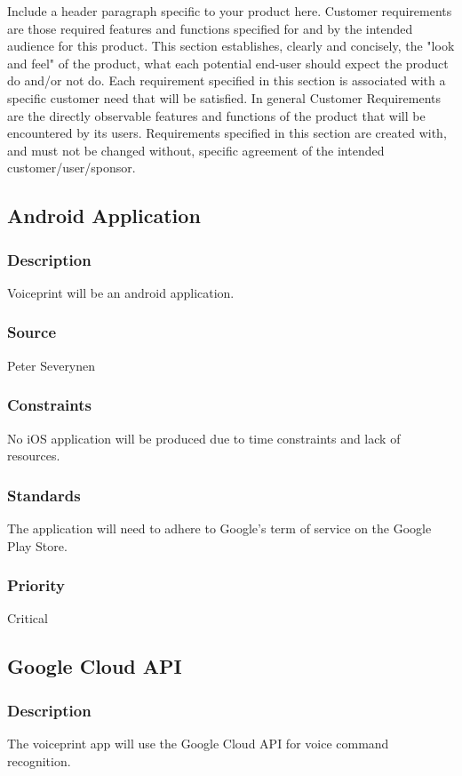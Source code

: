 Include a header paragraph specific to your product here. Customer requirements are those required features and functions specified for and by the intended audience for this product. This section establishes, clearly and concisely, the "look and feel" of the product, what each potential end-user should expect the product do and/or not do. Each requirement specified in this section is associated with a specific customer need that will be satisfied. In general Customer Requirements are the directly observable features and functions of the product that will be encountered by its users. Requirements specified in this section are created with, and must not be changed without, specific agreement of the intended customer/user/sponsor.

\subsection{Android Application}
\subsubsection{Description}
Voiceprint will be an android application.
\subsubsection{Source}
Peter Severynen
\subsubsection{Constraints}
No iOS application will be produced due to time constraints and lack of resources.
\subsubsection{Standards}
The application will need to adhere to Google's term of service on the Google Play Store.
\subsubsection{Priority}
Critical
\subsection{Google Cloud API}
\subsubsection{Description}
The voiceprint app will use the Google Cloud API for voice command recognition.
